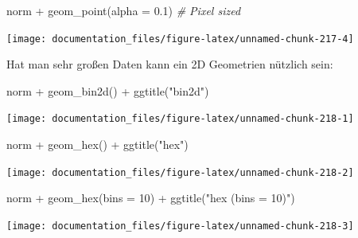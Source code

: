 \documentclass[
]{article}
\newenvironment{Shaded}{\begin{snugshade}}{\end{snugshade}}
\newcommand{\AttributeTok}[1]{\textcolor[rgb]{0.77,0.63,0.00}{#1}}
\newcommand{\CommentTok}[1]{\textcolor[rgb]{0.56,0.35,0.01}{\textit{#1}}}
\newcommand{\DecValTok}[1]{\textcolor[rgb]{0.00,0.00,0.81}{#1}}
\newcommand{\FloatTok}[1]{\textcolor[rgb]{0.00,0.00,0.81}{#1}}
\newcommand{\FunctionTok}[1]{\textcolor[rgb]{0.00,0.00,0.00}{#1}}
\newcommand{\NormalTok}[1]{#1}
\newcommand{\SpecialCharTok}[1]{\textcolor[rgb]{0.00,0.00,0.00}{#1}}
\newcommand{\StringTok}[1]{\textcolor[rgb]{0.31,0.60,0.02}{#1}}
\begin{document}
\begin{Shaded}
\begin{Highlighting}[]
\NormalTok{norm }\SpecialCharTok{+} \FunctionTok{geom\_point}\NormalTok{(}\AttributeTok{alpha =} \FloatTok{0.1}\NormalTok{) }\CommentTok{\# Pixel sized}
\end{Highlighting}
\end{Shaded}

\begin{center}\texttt{[image: documentation\_files/figure-latex/unnamed-chunk-217-4]} \end{center}

Hat man sehr großen Daten kann ein 2D Geometrien nützlich sein:

\begin{Shaded}
\begin{Highlighting}[]
\NormalTok{norm }\SpecialCharTok{+} \FunctionTok{geom\_bin2d}\NormalTok{() }\SpecialCharTok{+} \FunctionTok{ggtitle}\NormalTok{(}\StringTok{"bin2d"}\NormalTok{)}
\end{Highlighting}
\end{Shaded}

\begin{center}\texttt{[image: documentation\_files/figure-latex/unnamed-chunk-218-1]} \end{center}

\begin{Shaded}
\begin{Highlighting}[]
\NormalTok{norm }\SpecialCharTok{+} \FunctionTok{geom\_hex}\NormalTok{() }\SpecialCharTok{+} \FunctionTok{ggtitle}\NormalTok{(}\StringTok{"hex"}\NormalTok{)}
\end{Highlighting}
\end{Shaded}

\begin{center}\texttt{[image: documentation\_files/figure-latex/unnamed-chunk-218-2]} \end{center}

\begin{Shaded}
\begin{Highlighting}[]
\NormalTok{norm }\SpecialCharTok{+} \FunctionTok{geom\_hex}\NormalTok{(}\AttributeTok{bins =} \DecValTok{10}\NormalTok{) }\SpecialCharTok{+} \FunctionTok{ggtitle}\NormalTok{(}\StringTok{"hex (bins = 10)"}\NormalTok{)}
\end{Highlighting}
\end{Shaded}

\begin{center}\texttt{[image: documentation\_files/figure-latex/unnamed-chunk-218-3]} \end{center}
\end{document}
